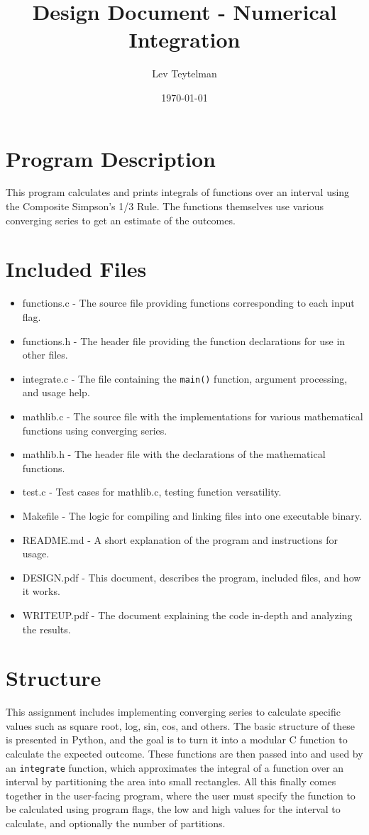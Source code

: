 \documentclass[12pt]{article}
\title{Design Document - Numerical Integration}
\author{Lev Teytelman}
\date{\today}
\begin{document}
\maketitle
\section{Program Description}

This program calculates and prints integrals of functions over an interval using the Composite Simpson's 1/3 Rule. The functions themselves use various converging series to get an estimate of the outcomes.
\section{Included Files}

\begin{itemize}
    \item functions.c - The source file providing functions corresponding to each input flag.
    \item functions.h - The header file providing the function declarations for use in other files.
    \item integrate.c - The file containing the \verb|main()| function, argument processing, and usage help.
    \item mathlib.c - The source file with the implementations for various mathematical functions using converging series.
    \item mathlib.h - The header file with the declarations of the mathematical functions.
    \item test.c - Test cases for mathlib.c, testing function versatility.
    \item Makefile - The logic for compiling and linking files into one executable binary.
    \item README.md - A short explanation of the program and instructions for usage.
    \item DESIGN.pdf - This document, describes the program, included files, and how it works.
    \item WRITEUP.pdf - The document explaining the code in-depth and analyzing the results.
\end{itemize}
\section{Structure}

This assignment includes implementing converging series to calculate specific values such as square root, log, sin, cos, and others. The basic structure of these is presented in Python, and the goal is to turn it into a modular C function to calculate the expected outcome. These functions are then passed into and used by an \verb|integrate| function, which approximates the integral of a function over an interval by partitioning the area into small rectangles. All this finally comes together in the user-facing program, where the user must specify the function to be calculated using program flags, the low and high values for the interval to calculate, and optionally the number of partitions.
\end{document}
